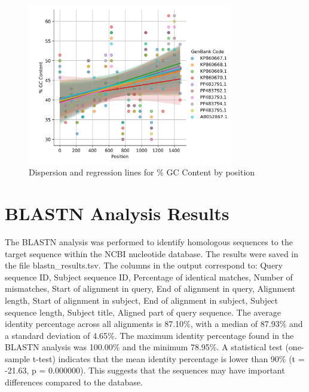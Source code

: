 \documentclass{article}%
\begin{document}
\begin{figure}[!htbp]%
\centering%
\includegraphics[width=0.8\textwidth]{scatterplot_gc.jpg}%
\caption{Dispersion and regression lines for \% GC Content by position}%
\end{figure}

%
\section{BLASTN Analysis Results}%
\label{sec:BLASTNAnalysisResults}%
The BLASTN analysis was performed to identify homologous sequences to the target sequence within the NCBI nucleotide database. The results were saved in the file blastn\_results.tsv. The columns in the output correspond to: Query sequence ID, Subject sequence ID, Percentage of identical matches, Number of mismatches, Start of alignment in query, End of alignment in query, Alignment length, Start of alignment in subject, End of alignment in subject, Subject sequence length, Subject title, Aligned part of query sequence.\newline%
%
\newline%
The average identity percentage across all alignments is 87.10\%, with a median of 87.93\% and a standard deviation of 4.65\%. The maximum identity percentage found in the BLASTN analysis was 100.00\% and the minimum 78.95\%. %
A statistical test (one{-}sample t{-}test) indicates that the mean identity percentage is lower than 90\% (t = {-}21.63, p = 0.000000). This suggests that the sequences may have important differences compared to the database.%
\end{document}
